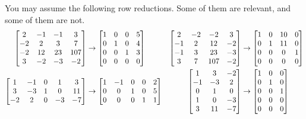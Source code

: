 \documentclass[a4paper]{article}
\begin{document}
\begin{problem}[2012-13]
 You may assume the following row reductions.  Some of them are
 relevant, and some of them are not.  
 \begin{align*}
    \left[\begin{matrix}
   2&-1&-1&3\\
   -2&2&3&7\\
   -2&12&23&107\\
   3&-2&-3&-2\\
   \end{matrix}\right]
   &\to
    \left[\begin{matrix}
   1&0&0&5\\
   0&1&0&4\\
   0&0&1&3\\
   0&0&0&0\\
   \end{matrix}\right]
    &
    \left[\begin{matrix}
   2&-2&-2&3\\
   -1&2&12&-2\\
   -1&3&23&-3\\
   3&7&107&-2\\
   \end{matrix}\right]
    &\to
    \left[\begin{matrix}
   1&0&10&0\\
   0&1&11&0\\
   0&0&0&1\\
   0&0&0&0\\
   \end{matrix}\right]
    \\
   \left[\begin{matrix}
   1&-1&0&1&3\\
   3&-3&1&0&11\\
   -2&2&0&-3&-7
   \end{matrix}\right]
    &\to
    \left[\begin{matrix}
   1&-1&0&0&2\\
   0&0&1&0&5\\
   0&0&0&1&1
   \end{matrix}\right]
    & 
    \left[\begin{matrix}
   1&3&-2\\
   -1&-3&2\\
   0&1&0\\
   1&0&-3\\
   3&11&-7
   \end{matrix}\right]
   &\to
    \left[\begin{matrix}
   1&0&0\\
   0&1&0\\
   0&0&1\\
   0&0&0\\
   0&0&0
   \end{matrix}\right]
    \\
 \end{align*}


\end{problem}
\end{document}

